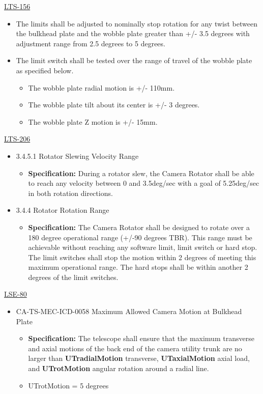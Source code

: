 \documentclass[SE,lsstdraft,authoryear,toc]{lsstdoc}
\begin{document}
\underline{LTS-156}

\begin{itemize}
\item
  The limits shall be adjusted to nominally stop rotation for any twist
  between the bulkhead plate and the wobble plate greater than +/- 3.5
  degrees with adjustment range from 2.5 degrees to 5 degrees.
\item
  The limit switch shall be tested over the range of travel of the
  wobble plate as specified below.

  \begin{itemize}
  \item
    The wobble plate radial motion is +/- 110mm.
  \item
    The wobble plate tilt about its center is +/- 3 degrees.
  \item
    The wobble plate Z motion is +/- 15mm.
  \end{itemize}
\end{itemize}

\underline{LTS-206}

\begin{itemize}
\item
  3.4.5.1 Rotator Slewing Velocity Range

  \begin{itemize}
  \item
    \textbf{Specification:} During a rotator slew, the Camera Rotator
    shall be able to reach any velocity between 0 and 3.5deg/sec with a
    goal of 5.25deg/sec in both rotation directions.
  \end{itemize}
\item
  3.4.4 Rotator Rotation Range

  \begin{itemize}
  \item
    \textbf{Specification:} The Camera Rotator shall be designed to
    rotate over a 180 degree operational range (+/-90 degrees TBR). This
    range must be achievable without reaching any software limit, limit
    switch or hard stop. The limit switches shall stop the motion within
    2 degrees of meeting this maximum operational range. The hard stops
    shall be within another 2 degrees of the limit switches.
  \end{itemize}
\end{itemize}

\underline{LSE-80}

\begin{itemize}
\item
  CA-TS-MEC-ICD-0058 Maximum Allowed Camera Motion at Bulkhead Plate

  \begin{itemize}
  \item
    \textbf{Specification:} The telescope shall ensure that the maximum
    transverse and axial motions of the back end of the camera utility
    trunk are no larger than \textbf{UTradialMotion} transverse,
    \textbf{UTaxialMotion} axial load, and \textbf{UTrotMotion} angular
    rotation around a radial line.
  \item
    UTrotMotion = 5 degrees
  \end{itemize}
\end{itemize}
\end{document}
